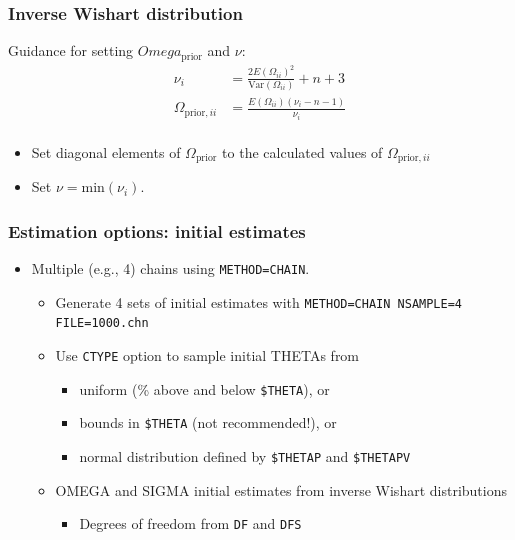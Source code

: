 \documentclass[handout]{beamer}
\begin{document}
\begin{frame}
  \frametitle{Inverse Wishart distribution}

Guidance for setting $Omega_\text{prior}$ and $\nu$:
\begin{align*}
  \nu_i &=
  \frac{2E\left(\Omega_{ii}\right)^2}{\text{Var}\left(\Omega_{ii}\right)} + n
  + 3 \\
\Omega_{\text{prior},ii} &= \frac{E\left(\Omega_{ii}\right)\left(\nu_i - n -
                          1\right)}{\nu_i} \\
\end{align*}
\begin{itemize}
\item Set diagonal elements of $\Omega_\text{prior}$ to the calculated values
of $\Omega_{\text{prior},ii}$
\item Set $\nu = \text{min}\left(\nu_i\right)$.
\end{itemize}

\end{frame}

\begin{frame}[fragile]
  \frametitle{Estimation options: initial estimates}

\begin{itemize}
  \item Multiple (e.g., 4) chains using \verb|METHOD=CHAIN|.
        \begin{itemize}
          \item Generate 4 sets of initial estimates with \verb|METHOD=CHAIN NSAMPLE=4 FILE=1000.chn|
          \item Use \verb|CTYPE| option to sample initial THETAs from
                \begin{itemize}
                  \item uniform (\% above and below \verb|$THETA|), or
                  \item bounds in \verb|$THETA| (not recommended!), or
                  \item normal distribution defined by \verb|$THETAP| and \verb|$THETAPV|
                \end{itemize}
          \item OMEGA and SIGMA initial estimates from inverse Wishart distributions
                \begin{itemize}
                  \item Degrees of freedom from \verb|DF| and \verb|DFS|
                \end{itemize}
        \end{itemize}
\end{itemize}

\end{frame}
\end{document}
